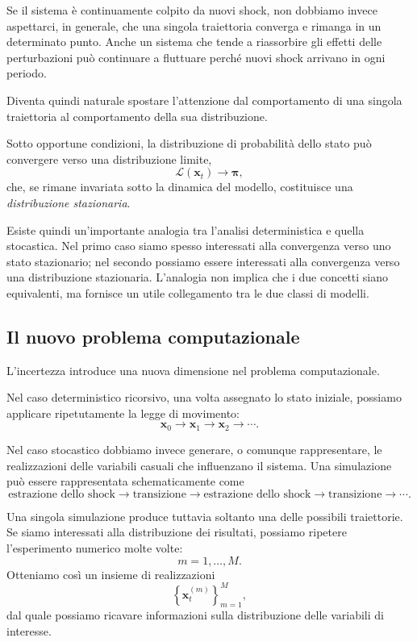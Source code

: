 \documentclass{book}
\begin{document}
Se il sistema è continuamente colpito da nuovi shock, non dobbiamo invece aspettarci, in generale, che una singola traiettoria converga e rimanga in un determinato punto. Anche un sistema che tende a riassorbire gli effetti delle perturbazioni può continuare a fluttuare perché nuovi shock arrivano in ogni periodo.

Diventa quindi naturale spostare l'attenzione dal comportamento di una singola traiettoria al comportamento della sua distribuzione.

Sotto opportune condizioni, la distribuzione di probabilità dello stato può convergere verso una distribuzione limite,
\[
\mathcal{L}(\mathbf{x}_t)\rightarrow\boldsymbol{\pi},
\]
che, se rimane invariata sotto la dinamica del modello, costituisce una \emph{distribuzione stazionaria}.

Esiste quindi un'importante analogia tra l'analisi deterministica e quella stocastica. Nel primo caso siamo spesso interessati alla convergenza verso uno stato stazionario; nel secondo possiamo essere interessati alla convergenza verso una distribuzione stazionaria. L'analogia non implica che i due concetti siano equivalenti, ma fornisce un utile collegamento tra le due classi di modelli.

\subsection{Il nuovo problema computazionale}

L'incertezza introduce una nuova dimensione nel problema computazionale.

Nel caso deterministico ricorsivo, una volta assegnato lo stato iniziale, possiamo applicare ripetutamente la legge di movimento:
\[
\mathbf{x}_0
\rightarrow
\mathbf{x}_1
\rightarrow
\mathbf{x}_2
\rightarrow\cdots.
\]

Nel caso stocastico dobbiamo invece generare, o comunque rappresentare, le realizzazioni delle variabili casuali che influenzano il sistema. Una simulazione può essere rappresentata schematicamente come
\[
\text{estrazione dello shock}
\rightarrow
\text{transizione}
\rightarrow
\text{estrazione dello shock}
\rightarrow
\text{transizione}
\rightarrow\cdots.
\]

Una singola simulazione produce tuttavia soltanto una delle possibili traiettorie. Se siamo interessati alla distribuzione dei risultati, possiamo ripetere l'esperimento numerico molte volte:
\[
m=1,\ldots,M.
\]
Otteniamo così un insieme di realizzazioni
\[
\left\{
\mathbf{x}_t^{(m)}
\right\}_{m=1}^{M},
\]
dal quale possiamo ricavare informazioni sulla distribuzione delle variabili di interesse.
\end{document}
